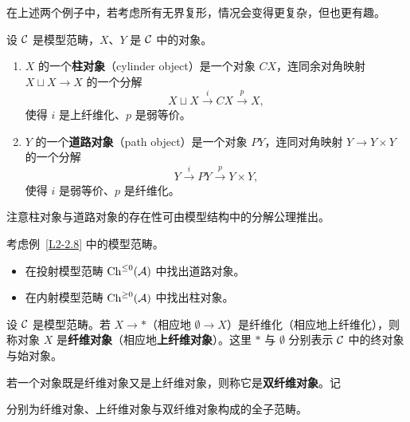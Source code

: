 \begin{remark}\label{L2-2.10}
在上述两个例子中，若考虑所有无界复形，情况会变得更复杂，但也更有趣。
\end{remark}

\begin{definition}\label{L2-2.11}
设 $\mathcal{C}$ 是模型范畴，$X$、$Y$ 是 $\mathcal{C}$ 中的对象。
\begin{enumerate}[label=(\arabic*),leftmargin=2.4em,itemsep=0.1em]
\item $X$ 的一个\textbf{柱对象}（cylinder object）是一个对象 $CX$，连同余对角映射 $X\sqcup X\to X$ 的一个分解
\[
X\sqcup X\xrightarrow{\ i\ }CX\xrightarrow{\ p\ }X,
\]
使得 $i$ 是上纤维化、$p$ 是弱等价。
\item $Y$ 的一个\textbf{道路对象}（path object）是一个对象 $PY$，连同对角映射 $Y\to Y\times Y$ 的一个分解
\[
Y\xrightarrow{\ i\ }PY\xrightarrow{\ p\ }Y\times Y,
\]
使得 $i$ 是弱等价、$p$ 是纤维化。
\end{enumerate}
\end{definition}

\begin{remark}\label{L2-2.12}
注意柱对象与道路对象的存在性可由模型结构中的分解公理推出。
\end{remark}

\begin{exercise}\label{L2-2.13}
考虑例~\ref{L2-2.8} 中的模型范畴。
\begin{itemize}[leftmargin=2.2em,itemsep=0.1em]
\item 在投射模型范畴 $\operatorname{Ch}^{\le0}(\mathcal{A})$ 中找出道路对象。
\item 在内射模型范畴 $\operatorname{Ch}^{\ge0}(\mathcal{A})$ 中找出柱对象。
\end{itemize}
\end{exercise}

\begin{definition}\label{L2-2.14}
设 $\mathcal{C}$ 是模型范畴。若 $X\to\ast$（相应地 $\emptyset\to X$）是纤维化（相应地上纤维化），则称对象 $X$ 是\textbf{纤维对象}（相应地\textbf{上纤维对象}）。这里 $\ast$ 与 $\emptyset$ 分别表示 $\mathcal{C}$ 中的终对象与始对象。

若一个对象既是纤维对象又是上纤维对象，则称它是\textbf{双纤维对象}。记
\begin{center}
\end{center}
分别为纤维对象、上纤维对象与双纤维对象构成的全子范畴。
\end{definition}

